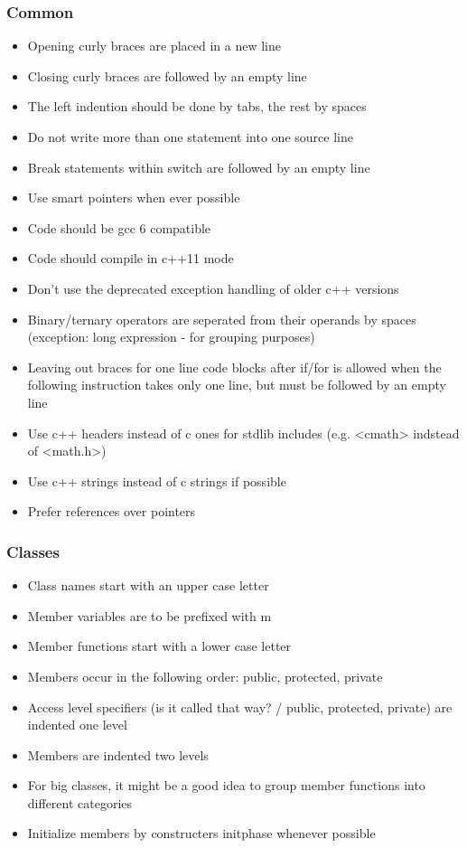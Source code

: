 \documentclass[a4paper]{scrartcl}
\begin{document}
\subsubsection{Common}
\begin{itemize}
	\item Opening curly braces are placed in a new line
	\item Closing curly braces are followed by an empty line
	\item The left indention should be done by tabs, the rest by spaces
	\item Do not write more than one statement into one source line
	\item Break statements within switch are followed by an empty line
	\item Use smart pointers when ever possible
	\item Code should be gcc 6 compatible
	\item Code should compile in c++11 mode
	\item Don't use the deprecated exception handling of older c++ versions
	\item Binary/ternary operators are seperated from their operands by spaces (exception: long expression - for grouping purposes)
	\item Leaving out braces for one line code blocks after if/for is allowed when the following instruction takes only one line, but must be followed by an empty line 
	\item Use c++ headers instead of c ones for stdlib includes (e.g. <cmath> indstead of <math.h>)
	\item Use c++ strings instead of c strings if possible
	\item Prefer references over pointers
\end{itemize}



\subsubsection{Classes}
\begin{itemize}
	\item Class names start with an upper case letter
	\item Member variables are to be prefixed with m
	\item Member functions start with a lower case letter
	\item Members occur in the following order: public, protected, private
	\item Access level specifiers (is it called that way? / public, protected, private) are indented one level
	\item Members are indented two levels
	\item For big classes, it might be a good idea to group member functions into different categories
	\item Initialize members by constructers initphase whenever possible
\end{itemize}
\end{document}
